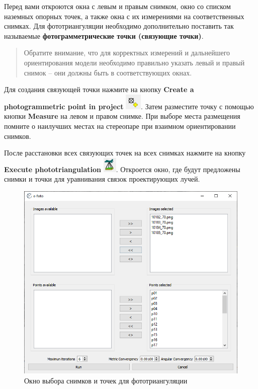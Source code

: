 \documentclass[
  12pt,
]{book}
\begin{document}
Перед вами откроются окна с левым и правым снимком, окно со списком наземных опорных точек, а также окна с их измерениями на соответственных снимках. Для фототриангуляции необходимо дополнительно поставить так называемые \textbf{фотограмметрические точки (связующие точки)}.

\begin{quote}
Обратите внимание, что для корректных измерений и дальнейшего ориентирования модели необходимо правильно указать левый и правый снимок -- они должны быть в соответствующих окнах.
\end{quote}

Для создания связующей точки нажмите на кнопку \textbf{Create a photogrammetric point in project} \includegraphics{images/Ref13/Tie_Point.png}. Затем разместите точку с помощью кнопки \textbf{Measure} на левом и правом снимке. При выборе места размещения помните о наилучших местах на стереопаре при взаимном ориентировании снимков.

После расстановки всех связующих точек на всех снимках нажмите на кнопку \textbf{Execute phototriangulation} \includegraphics{images/Ref13/Execute_EO.png}. Откроется окно, где будут предложены снимки и точки для уравнивания связок проектирующих лучей.

\begin{figure}
\centering
\includegraphics{images/Ref13/Phototriangulation_execution.png}
\caption{Окно выбора снимков и точек для фототриангуляции}
\end{figure}
\end{document}
